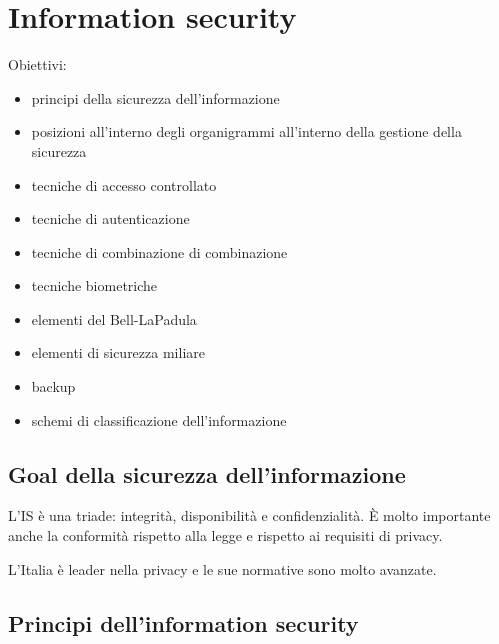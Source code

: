 \chapter{Information security}

Obiettivi:
\begin{itemize}
\item principi della sicurezza dell'informazione
\item posizioni all'interno degli organigrammi all'interno della gestione della
sicurezza
\item tecniche di accesso controllato
\item tecniche di autenticazione
\item tecniche di combinazione di combinazione
\item tecniche biometriche
\item elementi del Bell-LaPadula
\item elementi di sicurezza miliare
\item backup
\item schemi di classificazione dell'informazione
\end{itemize}

\section{Goal della sicurezza dell'informazione}

L'IS è una triade: integrità, disponibilità e confidenzialità. È molto
importante anche la conformità rispetto alla legge e rispetto ai requisiti di
privacy.

L'Italia è leader nella privacy e le sue normative sono molto avanzate.


\section{Principi dell'information security}

